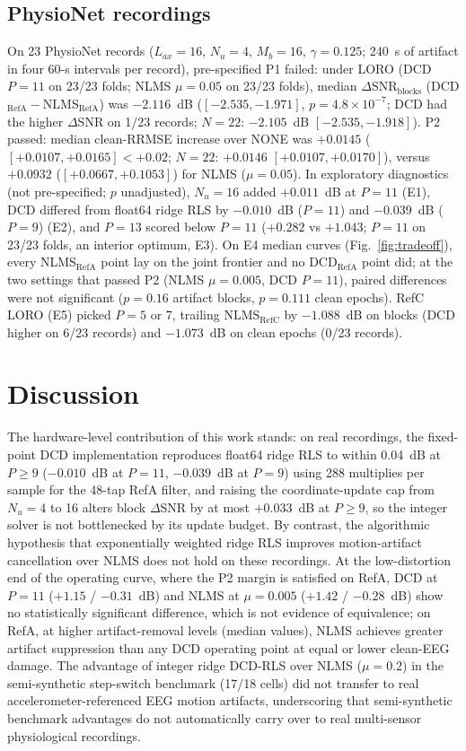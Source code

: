 \documentclass[conference]{IEEEtran}
\begin{document}
\subsection{PhysioNet recordings}
On 23 PhysioNet records ($L_{ax} = 16$, $N_u = 4$, $M_b = 16$, $\gamma = 0.125$; 240~s of artifact in four 60-s intervals per record), pre-specified P1 failed: under LORO (DCD $P = 11$ on 23/23 folds; NLMS $\mu = 0.05$ on 23/23 folds), median $\Delta$SNR$_\mathrm{blocks}$ (DCD$_\mathrm{RefA}-$NLMS$_\mathrm{RefA}$) was $-2.116$~dB ($[-2.535, -1.971]$, $p = 4.8\times10^{-7}$; DCD had the higher $\Delta$SNR on 1/23 records; $N = 22$: $-2.105$~dB $[-2.535, -1.918]$). P2 passed: median clean-RRMSE increase over NONE was $+0.0145$ ($[+0.0107, +0.0165] < +0.02$; $N = 22$: $+0.0146$ $[+0.0107, +0.0170]$), versus $+0.0932$ ($[+0.0667, +0.1053]$) for NLMS ($\mu = 0.05$). In exploratory diagnostics (not pre-specified; $p$ unadjusted), $N_u = 16$ added $+0.011$~dB at $P = 11$ (E1), DCD differed from float64 ridge RLS by $-0.010$~dB ($P = 11$) and $-0.039$~dB ($P = 9$) (E2), and $P = 13$ scored below $P = 11$ ($+0.282$ vs $+1.043$; $P = 11$ on 23/23 folds, an interior optimum, E3). On E4 median curves (Fig.~\ref{fig:tradeoff}), every NLMS$_\mathrm{RefA}$ point lay on the joint frontier and no DCD$_\mathrm{RefA}$ point did; at the two settings that passed P2 (NLMS $\mu = 0.005$, DCD $P = 11$), paired differences were not significant ($p = 0.16$ artifact blocks, $p = 0.111$ clean epochs). RefC LORO (E5) picked $P = 5$ or 7, trailing NLMS$_\mathrm{RefC}$ by $-1.088$~dB on blocks (DCD higher on 6/23 records) and $-1.073$~dB on clean epochs (0/23 records).



\section{Discussion}
The hardware-level contribution of this work stands: on real recordings, the fixed-point DCD implementation reproduces float64 ridge RLS to within 0.04~dB at $P \ge 9$ ($-0.010$~dB at $P = 11$, $-0.039$~dB at $P = 9$) using 288 multiplies per sample for the 48-tap RefA filter, and raising the coordinate-update cap from $N_u = 4$ to 16 alters block $\Delta$SNR by at most $+0.033$~dB at $P \ge 9$, so the integer solver is not bottlenecked by its update budget. By contrast, the algorithmic hypothesis that exponentially weighted ridge RLS improves motion-artifact cancellation over NLMS does not hold on these recordings. At the low-distortion end of the operating curve, where the P2 margin is satisfied on RefA, DCD at $P = 11$ ($+1.15$ / $-0.31$~dB) and NLMS at $\mu = 0.005$ ($+1.42$ / $-0.28$~dB) show no statistically significant difference, which is not evidence of equivalence; on RefA, at higher artifact-removal levels (median values), NLMS achieves greater artifact suppression than any DCD operating point at equal or lower clean-EEG damage. The advantage of integer ridge DCD-RLS over NLMS ($\mu = 0.2$) in the semi-synthetic step-switch benchmark (17/18 cells) did not transfer to real accelerometer-referenced EEG motion artifacts, underscoring that semi-synthetic benchmark advantages do not automatically carry over to real multi-sensor physiological recordings.
\end{document}
